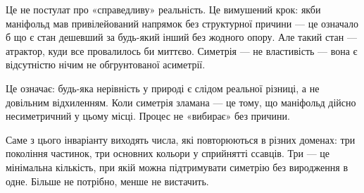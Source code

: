 \documentclass[12pt, a4paper, openany]{book}
\begin{document}
Це не постулат про «справедливу» реальність. Це вимушений крок: якби маніфольд мав привілейований напрямок без структурної причини --- це означало б що є стан дешевший за будь-який інший без жодного опору. Але такий стан — атрактор, куди все провалилось би миттєво. Симетрія — не властивість --- вона є відсутністю нічим не обгрунтованої асиметрії.

Це означає: будь-яка нерівність у природі є слідом реальної різниці, а не довільним відхиленням. Коли симетрія зламана --- це тому, що маніфольд дійсно несиметричний у цьому місці. Процес не «вибирає» без причини.

Саме з цього інваріанту виходять числа, які повторюються в різних доменах: три покоління частинок, три основних кольори у сприйнятті ссавців. Три --- це мінімальна кількість, при якій можна підтримувати симетрію без виродження в одне. Більше не потрібно, менше не вистачить.
\end{document}
